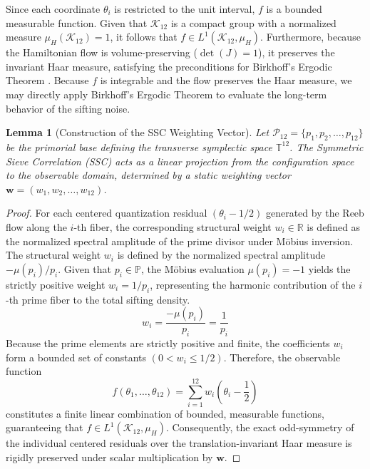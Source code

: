 \documentclass[sn-mathphys-num, pdflatex]{sn-jnl}
\newtheorem{lemma}{Lemma}
\begin{document}
Since each coordinate $\theta_i$ is restricted to the unit interval, $f$ is a bounded measurable function. Given that $\mathcal{K}_{12}$ is a compact group with a normalized measure $\mu_H(\mathcal{K}_{12}) = 1$, it follows that $f \in L^1(\mathcal{K}_{12}, \mu_H)$. Furthermore, because the Hamiltonian flow is volume-preserving ($\det(J)=1$), it preserves the invariant Haar measure, satisfying the preconditions for Birkhoff's Ergodic Theorem \cite{birkhoff1931proof}. Because $f$ is integrable and the flow preserves the Haar measure, we may directly apply Birkhoff's Ergodic Theorem to evaluate the long-term behavior of the sifting noise.

\begin{lemma}[Construction of the SSC Weighting Vector] \label{lem:ssc_weights}
Let $\mathcal{P}_{12} = \{p_1, p_2, \dots, p_{12}\}$ be the primorial base defining the transverse symplectic space $\mathbb{T}^{12}$. The Symmetric Sieve Correlation (SSC) acts as a linear projection from the configuration space to the observable domain, determined by a static weighting vector $\mathbf{w} = (w_1, w_2, \dots, w_{12})$. 
\end{lemma}

\begin{proof}
For each centered quantization residual $(\theta_i - 1/2)$ generated by the Reeb flow along the $i$-th fiber, the corresponding structural weight $w_i \in \mathbb{R}$ is defined as the normalized spectral amplitude of the prime divisor under Möbius inversion. The structural weight $w_i$ is defined by the normalized spectral amplitude $-\mu(p_i)/p_i$. Given that $p_i \in \mathbb{P}$, the Möbius evaluation $\mu(p_i) = -1$ yields the strictly positive weight $w_i = 1/p_i$, representing the harmonic contribution of the $i$-th prime fiber to the total sifting density.
\begin{equation}
w_i = \frac{-\mu(p_i)}{p_i} = \frac{1}{p_i}
\end{equation}
Because the prime elements are strictly positive and finite, the coefficients $w_i$ form a bounded set of constants $(0 < w_i \le 1/2)$. Therefore, the observable function 
\begin{equation}
f(\theta_1, \dots, \theta_{12}) = \sum_{i=1}^{12} w_i \left(\theta_i - \frac{1}{2}\right)
\end{equation}
constitutes a finite linear combination of bounded, measurable functions, guaranteeing that $f \in L^1(\mathcal{K}_{12}, \mu_H)$. Consequently, the exact odd-symmetry of the individual centered residuals over the translation-invariant Haar measure is rigidly preserved under scalar multiplication by $\mathbf{w}$.
\end{proof}
\end{document}
